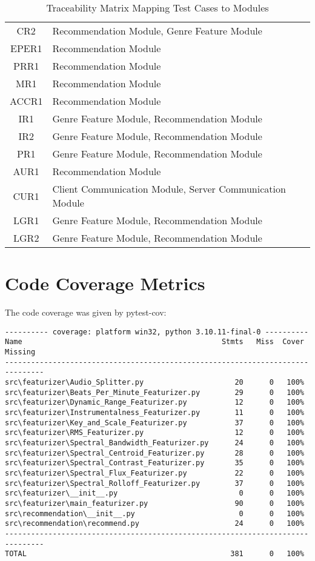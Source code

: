 \documentclass[12pt, titlepage]{article}
\begin{document}
\begin{table}[H]
\begin{tabularx}{\textwidth}{|c|X|}
      CR2 & Recommendation Module, Genre Feature Module \\
      EPER1 & Recommendation Module \\
      PRR1 & Recommendation Module \\
      MR1 & Recommendation Module \\
      ACCR1 & Recommendation Module \\
      IR1 & Genre Feature Module, Recommendation Module \\
      IR2 & Genre Feature Module, Recommendation Module \\
      PR1 & Genre Feature Module, Recommendation Module \\
      AUR1 & Recommendation Module \\
      CUR1 & Client Communication Module, Server Communication Module \\
      LGR1 & Genre Feature Module, Recommendation Module \\
      LGR2 & Genre Feature Module, Recommendation Module \\
      \hline
  \end{tabularx}
  \caption{Traceability Matrix Mapping Test Cases to Modules}
  \label{tab:trace_to_modules}
\end{table}

\section{Code Coverage Metrics} \label{sec:code-coverage}
The code coverage was given by pytest-cov:
\begin{small} 
  \begin{verbatim} 
---------- coverage: platform win32, python 3.10.11-final-0 ----------
Name                                              Stmts   Miss  Cover   Missing
-------------------------------------------------------------------------------
src\featurizer\Audio_Splitter.py                     20      0   100%
src\featurizer\Beats_Per_Minute_Featurizer.py        29      0   100%
src\featurizer\Dynamic_Range_Featurizer.py           12      0   100%
src\featurizer\Instrumentalness_Featurizer.py        11      0   100%
src\featurizer\Key_and_Scale_Featurizer.py           37      0   100%
src\featurizer\RMS_Featurizer.py                     12      0   100%
src\featurizer\Spectral_Bandwidth_Featurizer.py      24      0   100%
src\featurizer\Spectral_Centroid_Featurizer.py       28      0   100%
src\featurizer\Spectral_Contrast_Featurizer.py       35      0   100%
src\featurizer\Spectral_Flux_Featurizer.py           22      0   100%
src\featurizer\Spectral_Rolloff_Featurizer.py        37      0   100%
src\featurizer\__init__.py                            0      0   100%
src\featurizer\main_featurizer.py                    90      0   100%
src\recommendation\__init__.py                        0      0   100%
src\recommendation\recommend.py                      24      0   100%   
-------------------------------------------------------------------------------
TOTAL                                               381      0   100%
  \end{verbatim}
\end{small}
\end{document}
